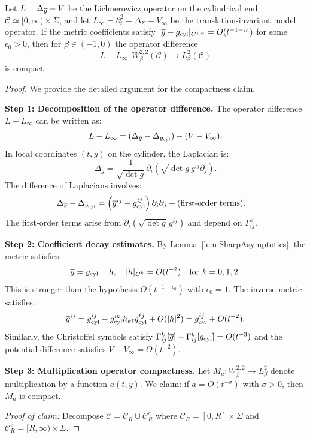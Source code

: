 \begin{proposition}\label{prop:CompactPerturbation}
Let $L = \Delta_{\overline{g}} - V$ be the Lichnerowicz operator on the cylindrical end $\mathcal{C} \simeq [0,\infty) \times \Sigma$, and let $L_\infty = \partial_t^2 + \Delta_\Sigma - V_\infty$ be the translation-invariant model operator. If the metric coefficients satisfy $|\overline{g} - g_{\text{cyl}}|_{C^{1,\alpha}} = O(t^{-1-\epsilon_0})$ for some $\epsilon_0 > 0$, then for $\beta \in (-1,0)$ the operator difference
\[
L - L_\infty : W^{2,2}_\beta(\mathcal{C}) \to L^2_\beta(\mathcal{C})
\]
is compact.
\end{proposition}
\begin{proof}
We provide the detailed argument for the compactness claim.

\textbf{Step 1: Decomposition of the operator difference.}
The operator difference $L - L_\infty$ can be written as:
\[
    L - L_\infty = (\Delta_{\overline{g}} - \Delta_{g_{\text{cyl}}}) - (V - V_\infty).
\]
In local coordinates $(t, y)$ on the cylinder, the Laplacian is:
\[
    \Delta_g = \frac{1}{\sqrt{\det g}} \partial_i \left( \sqrt{\det g} \, g^{ij} \partial_j \right).
\]
The difference of Laplacians involves:
\begin{align*}
    \Delta_{\overline{g}} - \Delta_{g_{\text{cyl}}} &= \left( \overline{g}^{ij} - g_{\text{cyl}}^{ij} \right) \partial_i \partial_j + \text{(first-order terms)}.
\end{align*}
The first-order terms arise from $\partial_i(\sqrt{\det g} \, g^{ij})$ and depend on $\Gamma^k_{ij}$.

\textbf{Step 2: Coefficient decay estimates.}
By Lemma~\ref{lem:SharpAsymptotics}, the metric satisfies:
\[
    \overline{g} = g_{\text{cyl}} + h, \quad |h|_{C^{k}} = O(t^{-2}) \quad \text{for } k = 0, 1, 2.
\]
This is stronger than the hypothesis $O(t^{-1-\epsilon_0})$ with $\epsilon_0 = 1$. The inverse metric satisfies:
\[
    \overline{g}^{ij} = g_{\text{cyl}}^{ij} - g_{\text{cyl}}^{ik} h_{k\ell} g_{\text{cyl}}^{\ell j} + O(|h|^2) = g_{\text{cyl}}^{ij} + O(t^{-2}).
\]
Similarly, the Christoffel symbols satisfy $\Gamma^k_{ij}[\overline{g}] - \Gamma^k_{ij}[g_{\text{cyl}}] = O(t^{-3})$ and the potential difference satisfies $V - V_\infty = O(t^{-2})$.

\textbf{Step 3: Multiplication operator compactness.}
Let $M_a : W^{2,2}_\beta \to L^2_\beta$ denote multiplication by a function $a(t,y)$. We claim: if $a = O(t^{-\sigma})$ with $\sigma > 0$, then $M_a$ is compact.

\textit{Proof of claim:} Decompose $\mathcal{C} = \mathcal{C}_R \cup \mathcal{C}_R^c$ where $\mathcal{C}_R = [0,R] \times \Sigma$ and $\mathcal{C}_R^c = [R,\infty) \times \Sigma$.


\end{proof}

